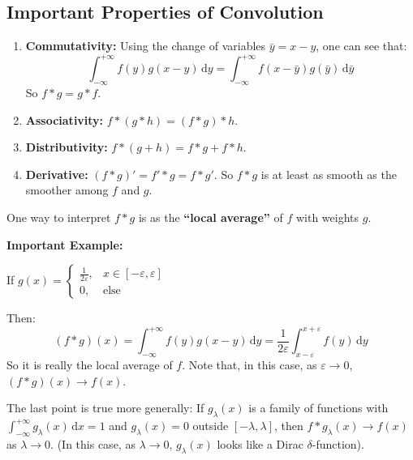 \subsection{Important Properties of Convolution}
\begin{enumerate}[label=\roman*)]
    \item \textbf{Commutativity:} Using the change of variables $\bar{y} = x - y$, one can see that:
    \begin{equation*}
        \int_{-\infty}^{+\infty} f(y) g(x - y) \,\mathrm{d}y = \int_{-\infty}^{+\infty} f(x - \bar{y}) g(\bar{y}) \,\mathrm{d}\bar{y}
    \end{equation*}
    So $f * g = g * f$.
    
    \item \textbf{Associativity:} $f * (g * h) = (f * g) * h$.
    
    \item \textbf{Distributivity:} $f * (g + h) = f * g + f * h$.
    
    \item \textbf{Derivative:} $(f * g)' = f' * g = f * g'$. 
    So $f * g$ is at least as smooth as the smoother among $f$ and $g$.
\end{enumerate}

One way to interpret $f * g$ is as the \textbf{``local average''} of $f$ with weights $g$.

\textbf{Important Example:}

If $g(x) = \begin{cases} \frac{1}{2\varepsilon}, & x \in [-\varepsilon, \varepsilon] \\ 0, & \text{else} \end{cases}$

Then:
\begin{equation*}
    (f * g)(x) = \int_{-\infty}^{+\infty} f(y) g(x - y) \,\mathrm{d}y = \frac{1}{2\varepsilon} \int_{x-\varepsilon}^{x+\varepsilon} f(y) \,\mathrm{d}y
\end{equation*}
So it is really the local average of $f$. Note that, in this case, as $\varepsilon \to 0$, $(f * g)(x) \to f(x)$.

The last point is true more generally: If $g_\lambda(x)$ is a family of functions with $\int_{-\infty}^{+\infty} g_\lambda(x) \,\mathrm{d}x = 1$ and $g_\lambda(x) = 0$ outside $[-\lambda, \lambda]$, then $f * g_\lambda(x) \to f(x)$ as $\lambda \to 0$. (In this case, as $\lambda \to 0$, $g_\lambda(x)$ looks like a Dirac $\delta$-function).

